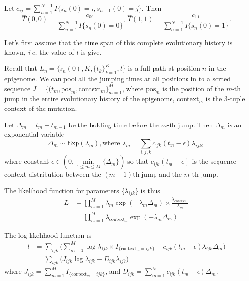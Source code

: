 \documentclass[11pt]{article}
\begin{document}
Let $c_{ij} = \sum_{n=1}^{N-1}I\{s_n(0) =i, s_{n+1}(0)=j\}$. Then 
\[ \hat{T}(0, 0) = \frac{c_{00}}{\sum_{n=1}^{N-1}I\{s_n(0) = 0\}}, ~ 
\hat{T}(1,1) = \frac{c_{11}}{\sum_{n=1}^{N-1}I\{s_n(0) = 1\}}.
\]

Let's first assume that the time span of this complete evolutionary
history is known, \textit{i.e.} the value of $t$ is give.

Recall that $L_n = \{s_n(0), K, \{t_k\}_{k=1}^K, t\}$ is a full path
at position $n$ in the epigenome. We can pool all the jumping times at
all positions in to a sorted sequence $J = \{(t_m, \text{pos}_m,
\text{context}_m \}_{m=1}^{M}$, where $\text{pos}_m$ is the position of the
$m$-th jump in the entire evolutionary history of the epigenome,
$\text{context}_m$ is the 3-tuple context of the mutation.

Let $\Delta_m = t_m - t_{m-1}$ be the holding time before the $m$-th
jump. Then $\Delta_m$ is an exponential variable 
\[
\Delta_m \sim \text{Exp}(\lambda_m), \text{where } \lambda_m = \sum\limits_{i,j,k}c_{ijk}(t_m - \epsilon)\lambda_{ijk},
\]
where constant $\epsilon \in (0, \min\limits_{1\le m \le M}\{\Delta_{m}\})$ so that $c_{ijk}(t_m - \epsilon)$ is the 
sequence context distribution between the $(m-1)$th jump and the $m$-th jump.

The likelihood function for parameters $\{\lambda_{ijk}\}$ is thus
\begin{equation}
\begin{aligned}
L &= \prod\limits_{m=1}^{M} \lambda_m \exp(-\lambda_m\Delta_m) \times \frac{\lambda_{\text{context}_m}}{\lambda_m} \\
&=\prod\limits_{m=1}^{M}\lambda_{\text{context}_m}\exp(-\lambda_m\Delta_m)
\end{aligned}
\end{equation}

The log-likelihood function is 
\begin{equation}\label{eqn:loglik1}
\begin{aligned}
l & = \sum\limits_{ijk} \big( \sum_{m=1}^M{\log\lambda_{ijk}\times I_{\{ \text{context}_m = ijk\}} - c_{ijk}(t_m-\epsilon)\lambda_{ijk}\Delta_m } \big) \\
& = \sum\limits_{ijk} \big(J_{ijk}\log\lambda_{ijk}-  D_{ijk}\lambda_{ijk} \big)
\end{aligned}
\end{equation}
where $J_{ijk} = \sum_{m=1}^M I_{\{\text{context}_m = ijk\}}$, and $D_{ijk} = \sum_{m=1}^Mc_{ijk}(t_m-\epsilon)\Delta_m$.
\end{document}
